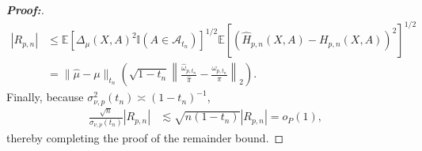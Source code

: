\documentclass[11pt,twoside]{article}
\theoremstyle{definition}
\theoremstyle{remark}
\begin{document}
\begin{proof}[\textbf{Proof:}]
\begin{align*}
     |R_{p,n}| &\leq \mathbb{E}\!\left[ \Delta_\mu(X,A)^2 \mathbb{I}(A\in\mathcal A_{t_n})\right]^{1/2} \mathbb{E}\!\left[\left(\widehat H_{p,n}(X,A)-H_{p,n}(X,A) \right)^2 \right]^{1/2} \\
    &= \|\widehat\mu-\mu\|_{t_n} \left(\sqrt{1-t_n} \left\| \frac{\widehat\omega_{p,t_n}}{\widehat\pi} - \frac{\omega_{p,t_n}}{\pi} \right\|_2 \right).
\end{align*}
Finally, because $\sigma_{\nu,p}^2(t_n)\asymp(1-t_n)^{-1}$,
\begin{align*}
    \frac{\sqrt{n}}{\sigma_{\nu,p}(t_n)} |R_{p,n}| &\lesssim
    \sqrt{n(1-t_n)}|R_{p,n}| =o_P(1),
\end{align*}
thereby completing the proof of the remainder bound. 

\medskip 


\end{proof}
\end{document}
